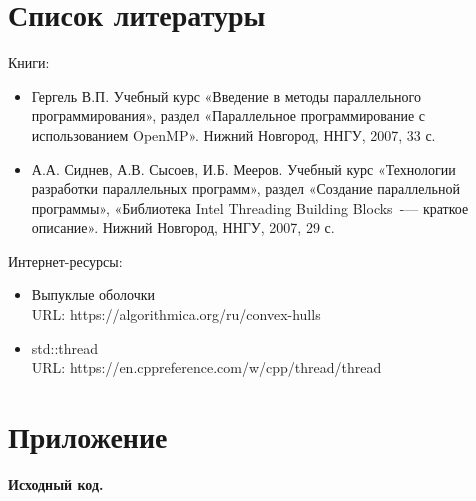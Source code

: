 \documentclass{report}
\begin{document}
\newpage

\section{Список литературы}
Книги:

\begin{itemize}
\item Гергель В.П. Учебный курс «Введение в методы параллельного программирования», раздел «Параллельное программирование с использованием OpenMP». Нижний Новгород, ННГУ, 2007, 33 с.
\item А.А. Сиднев, А.В. Сысоев, И.Б. Мееров. Учебный курс «Технологии разработки параллельных программ», раздел «Создание параллельной программы», «Библиотека Intel Threading Building Blocks~-— краткое описание». Нижний Новгород, ННГУ, 2007, 29 с.
\end{itemize}

\par Интернет-ресурсы:

\begin{itemize}
\item Выпуклые оболочки \\ URL: https://algorithmica.org/ru/convex-hulls
\item std::thread \\ URL: https://en.cppreference.com/w/cpp/thread/thread
\end{itemize}

\newpage

\section{Приложение}
\centerline{\bfseries Исходный код.} 








\end{document}
